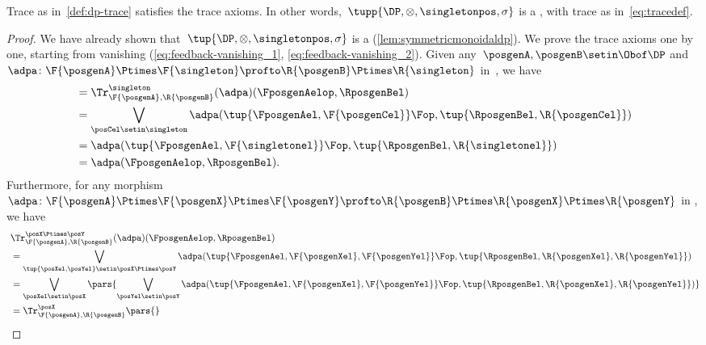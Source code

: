 {    \begin{lemma}\label{lem:dp-trace-is-trace_copy}
        Trace as in~\cref{def:dp-trace} satisfies the trace axioms.
        In other words,~$\tupp{\DP, {{\otimes}}, \singletonpos, \sigma}$ is a , with trace as in~\cref{eq:tracedef}.
    \end{lemma}
    \begin{proof}
        We have already shown that~$\tup{\DP,{{\otimes}},\singletonpos,\sigma}$ is a  (\cref{lem:symmetricmonoidaldp}).
        We prove the trace axioms one by one, starting from vanishing (\cref{eq:feedback-vanishing_1}, \cref{eq:feedback-vanishing_2}).
        Given any~$\posgenA,\posgenB\setin \Obof\DP$ and~$\adpa\colon \F{\posgenA}\Ptimes \F{\singleton}\profto \R{\posgenB}\Ptimes \R{\singleton}$ in~\DP, we have
        \begin{equation}
            \begin{aligned}
                 & = \Tr_{\F{\posgenA},\R{\posgenB}}^{\singleton}(\adpa)(\FposgenAelop,\RposgenBel) \\
                 & =\bigvee_{\posCel\setin \singleton}\adpa(\tup{\FposgenAel,\F{\posgenCel}}\Fop, \tup{\RposgenBel,\R{\posgenCel}}) \\
                 & =\adpa(\tup{\FposgenAel,\F{\singletonel}}\Fop, \tup{\RposgenBel,\R{\singletonel}}) \\
                 & =\adpa(\FposgenAelop,\RposgenBel).
            \end{aligned}
        \end{equation}
        Furthermore, for any morphism~$\adpa\colon \F{\posgenA}\Ptimes \F{\posgenX}\Ptimes \F{\posgenY} \profto \R{\posgenB}\Ptimes \R{\posgenX} \Ptimes \R{\posgenY}$ in \DP, we have
        \begin{equation}
            \begin{aligned}
                ~ & \Tr_{\F{\posgenA},\R{\posgenB}}^{\posX\Ptimes\posY}(\adpa)(\FposgenAelop,\RposgenBel) \\
                  & = \bigvee_{\tup{\posXel,\posYel} \setin \posX\Ptimes \posY} \adpa(\tup{\FposgenAel,\F{\posgenXel},\F{\posgenYel}}\Fop, \tup{\RposgenBel,\R{\posgenXel},\R{\posgenYel}}) \\
                  & =\bigvee_{\posXel \setin \posX}\pars{\bigvee_{\posYel \setin \posY} \adpa(\tup{\FposgenAel,\F{\posgenXel},\F{\posgenYel}}\Fop, \tup{\RposgenBel,\R{\posgenXel},\R{\posgenYel}})} \\
                  & =\Tr_{\F{\posgenA},\R{\posgenB}}^\posX\pars{
}
\end{aligned}
\end{equation}
\end{proof}}
